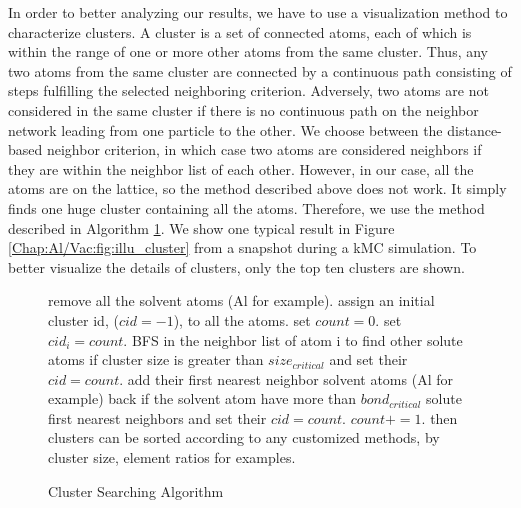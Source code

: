 In order to better analyzing our results, we have to use a visualization method to characterize clusters. A cluster is a set of connected atoms, each of which is within the range of one or more other atoms from the same cluster. Thus, any two atoms from the same cluster are connected by a continuous path consisting of steps fulfilling the selected neighboring criterion. Adversely, two atoms are not considered in the same cluster if there is no continuous path on the neighbor network leading from one particle to the other. We choose between the distance-based neighbor criterion, in which case two atoms are considered neighbors if they are within the neighbor list of each other. However, in our case, all the atoms are on the lattice, so the method described above does not work. It simply finds one huge cluster containing all the atoms. Therefore, we use the method described in Algorithm \ref{algo:cluster}. We show one typical result in Figure \ref{Chap:Al/Vac:fig:illu_cluster} from a snapshot during a kMC simulation. To better visualize the details of clusters,  only the top ten clusters are shown. 


\begin{figure}[!htb]
  \centering
  \begin{minipage}{.75\linewidth}
    \begin{algorithm}[H]
      \caption{Cluster Searching Algorithm}\label{algo:cluster}
      \begin{algorithmic}[1]
        \State remove all the solvent atoms (Al for example).
        \State assign an initial cluster id, ($cid = -1$), to all the atoms.
        \State set $count = 0$.
            \State set $cid_i = count$.
            \State \ac{BFS} in the neighbor list of atom i to find other solute atoms if cluster size is greater than $size_{critical}$ and set their $cid = count$.
            \State add their first nearest neighbor solvent atoms (Al for example) back if the solvent atom have more than $bond_{critical}$ solute first nearest neighbors and set their $cid = count$.
            \State $count += 1$.
          \EndIf
        \EndFor
        \State then clusters can be sorted according to any customized methods, by cluster size, element ratios for examples.
      \end{algorithmic}
    \end{algorithm}
  \end{minipage}
\end{figure}


